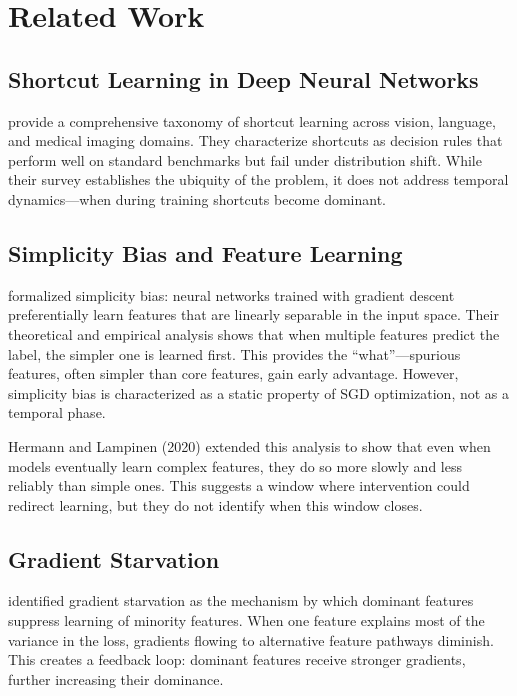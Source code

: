 \section{Related Work}

\subsection{Shortcut Learning in Deep Neural Networks}

\citet{geirhos2020shortcut} provide a comprehensive taxonomy of shortcut learning across vision, language, and medical imaging domains. They characterize shortcuts as decision rules that perform well on standard benchmarks but fail under distribution shift. While their survey establishes the ubiquity of the problem, it does not address temporal dynamics---when during training shortcuts become dominant.

\subsection{Simplicity Bias and Feature Learning}

\citet{shah2020simplicity} formalized simplicity bias: neural networks trained with gradient descent preferentially learn features that are linearly separable in the input space. Their theoretical and empirical analysis shows that when multiple features predict the label, the simpler one is learned first. This provides the ``what''---spurious features, often simpler than core features, gain early advantage. However, simplicity bias is characterized as a static property of SGD optimization, not as a temporal phase.

Hermann and Lampinen (2020) extended this analysis to show that even when models eventually learn complex features, they do so more slowly and less reliably than simple ones. This suggests a window where intervention could redirect learning, but they do not identify when this window closes.

\subsection{Gradient Starvation}

\citet{pezeshki2021gradient} identified gradient starvation as the mechanism by which dominant features suppress learning of minority features. When one feature explains most of the variance in the loss, gradients flowing to alternative feature pathways diminish. This creates a feedback loop: dominant features receive stronger gradients, further increasing their dominance.

